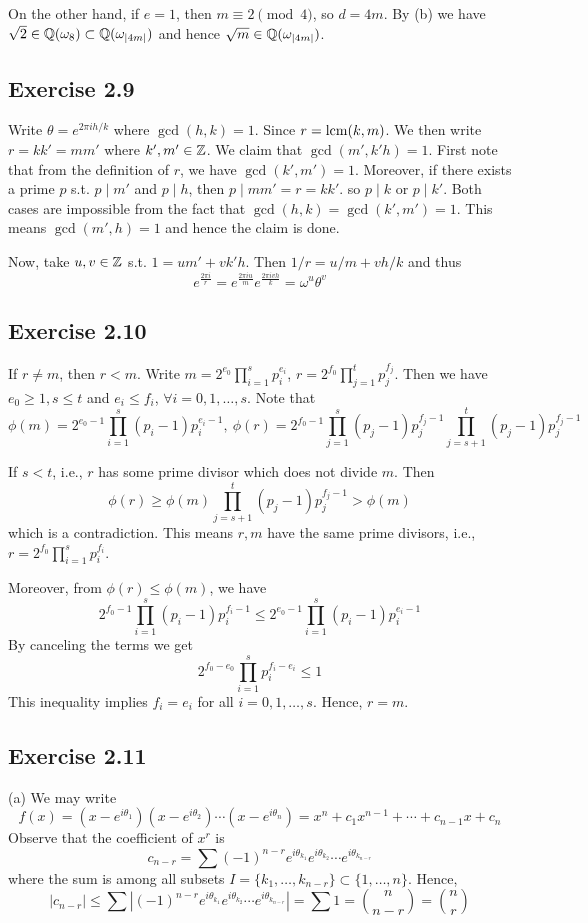 \documentclass[../Marcus.tex]{subfiles}
\begin{document}
On the other hand, if $e=1$, then $m\equiv 2\pmod{4}$, so $d=4m$. By (b) we have $\sqrt{2}\in\mathbb{Q}(\omega_8)\subset\mathbb{Q}(\omega_{|4m|})$ and hence $\sqrt{m}\in\mathbb{Q}(\omega_{|4m|})$.
 
\subsection*{Exercise 2.9}

Write $\theta=e^{2\pi ih/k}$ where $\gcd(h,k)=1$. Since $r=\operatorname{lcm}(k,m)$. We then write $r=kk'=mm'$ where $k',m'\in\mathbb{Z}$. We claim that $\gcd(m',k'h)=1$. First note that from the definition of $r$, we have $\gcd(k',m')=1$. Moreover, if there exists a prime $p$ s.t. $p\mid m'$ and $p\mid h$, then $p\mid mm'=r=kk'$. so $p\mid k$ or $p\mid k'$. Both cases are impossible from the fact that $\gcd(h,k)=\gcd(k',m')=1$. This means $\gcd(m',h)=1$ and hence the claim is done.

Now, take $u,v\in\mathbb{Z}$ s.t. $1=um'+vk'h$. Then $1/r=u/m+vh/k$ and thus $$e^{\frac{2\pi i}{r}}=e^{\frac{2\pi iu}{m}}e^{\frac{2\pi ivh}{k}}=\omega^u\theta^v$$

\subsection*{Exercise 2.10}

If $r\neq m$, then $r<m$. Write $m=2^{e_0}\prod_{i=1}^s p_i^{e_i}$, $r=2^{f_0}\prod_{j=1}^t p_j^{f_j}$. Then we have $e_0\geq 1,s\leq t$ and
$e_i\leq f_i$, $\forall i=0,1,\ldots,s$. Note that $$\phi(m)=2^{e_0-1}\prod_{i=1}^s (p_i-1)p_i^{e_i-1},\ \phi(r)=2^{f_0-1}\prod_{j=1}^s (p_j-1)p_j^{f_j-1}\prod_{j=s+1}^t (p_j-1)p_j^{f_j-1}$$

If $s<t$, i.e., $r$ has some prime divisor which does not divide $m$. Then $$\phi(r)\geq \phi(m)\prod_{j=s+1}^t (p_j-1)p_j^{f_j-1} > \phi(m)$$ which is a contradiction. This means $r,m$ have the same prime divisors, i.e., $r=2^{f_0}\prod_{i=1}^s p_i^{f_i}$.

Moreover, from $\phi(r)\leq \phi(m)$, we have $$2^{f_0-1}\prod_{i=1}^s (p_i-1)p_i^{f_i-1}\leq 2^{e_0-1}\prod_{i=1}^s (p_i-1)p_i^{e_i-1}$$ By canceling the terms we get $$2^{f_0-e_0}\prod_{i=1}^s p_i^{f_i-e_i}\leq 1$$ This inequality implies $f_i=e_i$ for all $i=0,1,\ldots,s$. Hence, $r=m$.
\subsection*{Exercise 2.11}

(a) We may write $$f(x)=(x-e^{i\theta_1})(x-e^{i\theta_2})\cdots(x-e^{i\theta_n})=x^n+c_1x^{n-1}+\cdots+c_{n-1}x+c_n$$ Observe that the coefficient of $x^r$ is $$c_{n-r}=\sum (-1)^{n-r}e^{i\theta_{k_1}}e^{i\theta_{k_2}}\cdots e^{i\theta_{k_{n-r}}}$$ where the sum is among all subsets $I=\{k_1,\ldots,k_{n-r}\} \subset \{1,\ldots,n\}$. Hence, $$|c_{n-r}|\leq \sum \left|(-1)^{n-r}e^{i\theta_{k_1}}e^{i\theta_{k_2}}\cdots e^{i\theta_{k_{n-r}}}\right| =\sum 1=\binom{n}{n-r}=\binom{n}{r}$$
\end{document}
